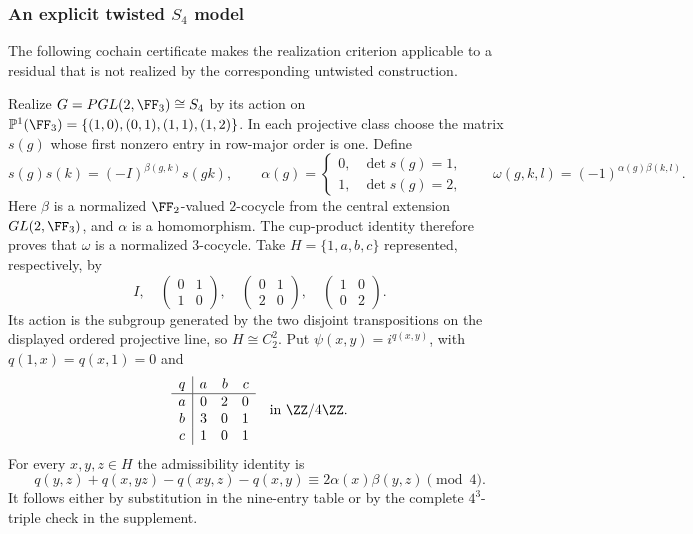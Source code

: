 \subsubsection{An explicit twisted $S_4$ model}
The following cochain certificate makes the realization criterion
applicable to a residual that is not realized by the corresponding
untwisted construction.

Realize $G=PGL(2,\FF_3)\cong S_4$ by its action on
$\mathbb P^1(\FF_3)=\{(1,0),(0,1),(1,1),(1,2)\}$.
In each projective class choose the matrix $s(g)$ whose first nonzero
entry in row-major order is one. Define
\[
 s(g)s(k)=(-I)^{\beta(g,k)}s(gk),\qquad
 \alpha(g)=\begin{cases}0,&\det s(g)=1,\\1,&\det s(g)=2,\end{cases}
 \qquad
 \omega(g,k,l)=(-1)^{\alpha(g)\beta(k,l)}.
\]
Here $\beta$ is a normalized $\FF_2$-valued $2$-cocycle from the central
extension $GL(2,\FF_3)$, and $\alpha$ is a homomorphism. The cup-product
identity therefore proves that $\omega$ is a normalized $3$-cocycle.
Take $H=\{1,a,b,c\}$ represented, respectively, by
\[
 I,\quad
 \begin{pmatrix}0&1\\1&0\end{pmatrix},\quad
 \begin{pmatrix}0&1\\2&0\end{pmatrix},\quad
 \begin{pmatrix}1&0\\0&2\end{pmatrix}.
\]
Its action is the subgroup generated by the two disjoint transpositions
on the displayed ordered projective line, so $H\cong C_2^2$.
Put $\psi(x,y)=i^{q(x,y)}$, with $q(1,x)=q(x,1)=0$ and
\begin{equation}\label{eq:s4-cochain}
 \begin{array}{c|rrr}
 q&a&b&c\\\hline
 a&0&2&0\\
 b&3&0&1\\
 c&1&0&1
 \end{array}\quad\text{in }\ZZ/4\ZZ.
\end{equation}
For every $x,y,z\in H$ the admissibility identity is
\[
 q(y,z)+q(x,yz)-q(xy,z)-q(x,y)
 \equiv 2\alpha(x)\beta(y,z)\pmod4.
\]
It follows either by substitution in the nine-entry table or by the
complete $4^3$-triple check in the supplement.

